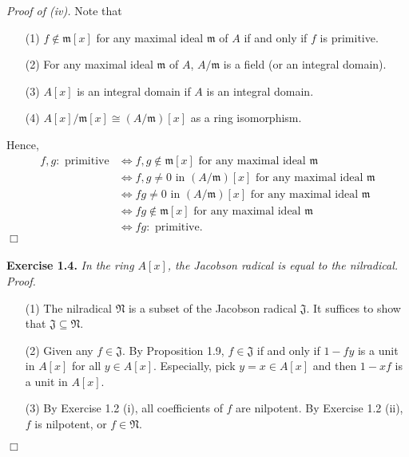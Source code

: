 \documentclass{article}
\begin{document}
\emph{Proof of (iv).}
Note that
\begin{enumerate}
\item[(1)]
$f \notin \mathfrak{m}[x]$ for any maximal ideal $\mathfrak{m}$ of $A$
if and only if $f$ is primitive.
\item[(2)]
For any maximal ideal $\mathfrak{m}$ of $A$,
$A/\mathfrak{m}$ is a field (or an integral domain).
\item[(3)]
$A[x]$ is an integral domain if $A$ is an integral domain.
\item[(4)]
$A[x]/\mathfrak{m}[x] \cong (A/\mathfrak{m})[x]$ as a ring isomorphism.
\end{enumerate}
Hence,
\begin{align*}
f, g:\text{ primitive}
&\Longleftrightarrow
f, g \notin \mathfrak{m}[x] \text{ for any maximal ideal } \mathfrak{m} \\
&\Longleftrightarrow
f, g \neq 0 \text{ in } (A/\mathfrak{m})[x] \text{ for any maximal ideal } \mathfrak{m} \\
&\Longleftrightarrow
fg \neq 0 \text{ in } (A/\mathfrak{m})[x] \text{ for any maximal ideal } \mathfrak{m} \\
&\Longleftrightarrow
fg \notin \mathfrak{m}[x] \text{ for any maximal ideal } \mathfrak{m} \\
&\Longleftrightarrow
fg:\text{ primitive}.
\end{align*}
$\Box$ \\\\



\textbf{Exercise 1.4.}
\emph{In the ring $A[x]$, the Jacobson radical is equal to the nilradical.} \\

\emph{Proof.}
\begin{enumerate}
\item[(1)]
The nilradical $\mathfrak{N}$ is a subset of the Jacobson radical $\mathfrak{J}$.
It suffices to show that $\mathfrak{J} \subseteq \mathfrak{N}$.
\item[(2)]
Given any $f \in \mathfrak{J}$. By Proposition 1.9,
$f \in \mathfrak{J}$ if and only if
$1 - fy$ is a unit in $A[x]$ for all $y \in A[x]$.
Especially, pick $y = x \in A[x]$ and then $1 - xf$ is a unit in $A[x]$.
\item[(3)]
By Exercise 1.2 (i), all coefficients of $f$ are nilpotent.
By Exercise 1.2 (ii), $f$ is nilpotent, or $f \in \mathfrak{N}$.
\end{enumerate}
$\Box$ \\\\
\end{document}
